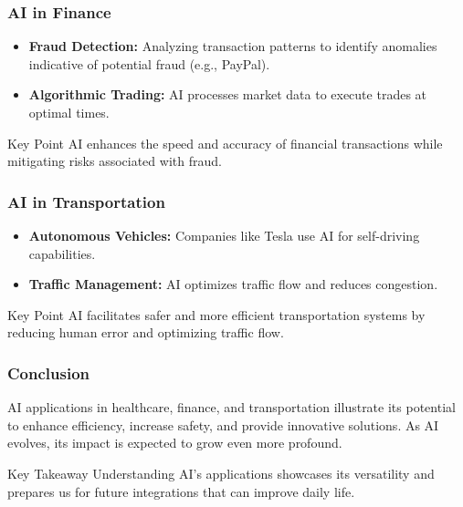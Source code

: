 \documentclass[aspectratio=169]{beamer}
\begin{document}
\begin{frame}[fragile]
    \frametitle{AI in Finance}
    \begin{itemize}
        \item \textbf{Fraud Detection:} Analyzing transaction patterns to identify anomalies indicative of potential fraud (e.g., PayPal).
        \item \textbf{Algorithmic Trading:} AI processes market data to execute trades at optimal times.
    \end{itemize}
    \begin{block}{Key Point}
        AI enhances the speed and accuracy of financial transactions while mitigating risks associated with fraud.
    \end{block}
\end{frame}

\begin{frame}[fragile]
    \frametitle{AI in Transportation}
    \begin{itemize}
        \item \textbf{Autonomous Vehicles:} Companies like Tesla use AI for self-driving capabilities.
        \item \textbf{Traffic Management:} AI optimizes traffic flow and reduces congestion.
    \end{itemize}
    \begin{block}{Key Point}
        AI facilitates safer and more efficient transportation systems by reducing human error and optimizing traffic flow.
    \end{block}
\end{frame}

\begin{frame}[fragile]
    \frametitle{Conclusion}
    AI applications in healthcare, finance, and transportation illustrate its potential to enhance efficiency, increase safety, and provide innovative solutions. 
    As AI evolves, its impact is expected to grow even more profound.
    \begin{block}{Key Takeaway}
        Understanding AI's applications showcases its versatility and prepares us for future integrations that can improve daily life.
    \end{block}
\end{frame}
\end{document}
